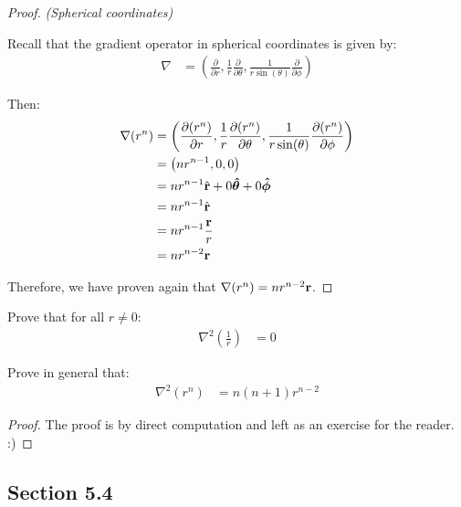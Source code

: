 \begin{proof}
\textit{(Spherical coordinates)}

Recall that the gradient operator in spherical coordinates is given by:
\begin{align}
    \nabla &= \left(\frac{\partial}{\partial r}, \frac{1}{r}\frac{\partial}{\partial \theta}, \frac{1}{r\sin(\theta)}\frac{\partial}{\partial \phi}\right)
\end{align}

Then:
\begin{align*}
    \nabla(r^n) &= \left(\frac{\partial (r^n)}{\partial r}, \frac{1}{r}\frac{\partial (r^n)}{\partial \theta}, \frac{1}{r\sin(\theta)}\frac{\partial (r^n)}{\partial \phi}\right) \\
    &= \left(n r^{n - 1}, 0, 0\right) \\
    &= n r^{n - 1} \hat{\vb{r}} + 0 \boldsymbol{\hat{\theta}} + 0 \boldsymbol{\hat{\phi}} \\
    &= n r^{n - 1} \hat{\vb{r}} \\
    &= n r^{n - 1} \frac{\vb{r}}{r} \\
    &= n r^{n - 2} \vb{r}
\end{align*}

Therefore, we have proven again that \(\nabla(r^n) = n r^{n - 2} \vb{r}\).
\end{proof}

\begin{tcolorbox}[
        title={Problem 38 (b)},
        valign=center,
        nobeforeafter,
        colframe=gray!95!black
    ]

    Prove that for all \(r \neq 0\):
    \begin{align}
        \nabla^2\left(\frac{1}{r}\right) &= 0
    \end{align}
    
    Prove in general that:
    \begin{align}
        \nabla^2(r^n) &= n (n + 1) r^{n - 2}
    \end{align}
\end{tcolorbox}

\begin{proof}
    The proof is by direct computation and left as an exercise for the reader. :)
\end{proof}

\subsection{Section 5.4}

